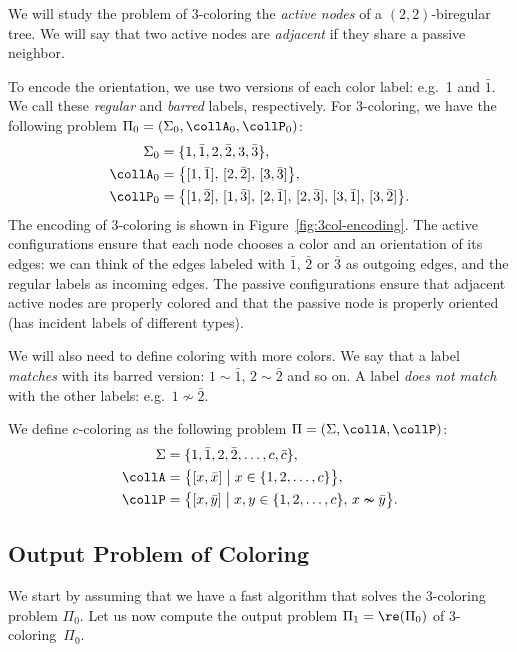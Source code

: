 We will study the problem of $3$-coloring the \emph{active nodes} of a $(2,2)$-biregular tree. We will say that two active nodes are \emph{adjacent} if they share a passive neighbor. 

To encode the orientation, we use two versions of each color label: e.g.\ 1 and $\bar{1}$. We call these \emph{regular} and \emph{barred} labels, respectively. For 3-coloring, we have the following problem $\Pi_0 = (\Sigma_0, \collA_0, \collP_0)$:
\begin{align*}
	\Sigma_0 &= \{ 1,\bar{1},2,\bar{2},3,\bar{3} \}, \\
	\collA_0 &= \bigl\{ [ 1, \bar{1} ],\, [2,\bar{2}],\, [3,\bar{3}] \bigr\}, \\
	\collP_0 &= \bigl\{ [ 1, \bar{2}],\, [1, \bar{3}],\, [2, \bar{1}],\, [2, \bar{3}],\,[3,\bar{1}],\,[3,\bar{2}] \bigr\}.
\end{align*}
The encoding of 3-coloring is shown in Figure~\ref{fig:3col-encoding}. The active configurations ensure that each node chooses a color and an orientation of its edges: we can think of the edges labeled with $\bar{1}$, $\bar{2}$ or $\bar{3}$ as outgoing edges, and the regular labels as incoming edges. The passive configurations ensure that adjacent active nodes are properly colored and that the passive node is properly oriented (has incident labels of different types).

We will also need to define coloring with more colors. We say that a label \emph{matches} with its barred version: $1 \sim \bar{1}$, $2 \sim \bar{2}$ and so on. A label \emph{does not match} with the other labels: e.g.\ $1 \nsim \bar{2}$. 

We define $c$-coloring as the following problem $\Pi = (\Sigma, \collA, \collP)$:
\begin{align*}
	\Sigma &= \{ 1,\bar{1},2,\bar{2},\dots,c,\bar{c} \}, \\
	\collA &= \bigl\{ [ x, \bar x ] \bigm| x \in \{1,2,\dots,c\} \bigr\}, \\
	\collP &= \bigl\{ [ x, \bar y ] \bigm| x, y \in \{1,2,\dots,c\},\, x \nsim \bar y \bigr\}.
\end{align*}

\subsection{Output Problem of Coloring}

We start by assuming that we have a fast algorithm that solves the $3$-coloring problem $\Pi_0$. Let us now compute the output problem $\Pi_1 = \re(\Pi_0)$ of $3$-coloring~$\Pi_0$.


